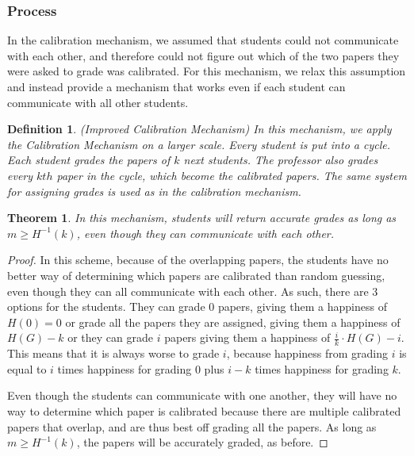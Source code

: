 \documentclass[12pt, Arial]{article}
\newtheorem{theorem}{Theorem}
\newtheorem{definition}{Definition}
\begin{document}
\subsubsection{Process}
In the calibration mechanism, we assumed that students could not communicate with each other, and therefore could not figure out which of the two papers they were asked to grade was calibrated. For this mechanism, we relax this assumption and instead provide a mechanism that works even if each student can communicate with all other students.\\
\begin{definition}(Improved Calibration Mechanism)
In this mechanism, we apply the Calibration Mechanism on a larger scale. Every student is put into a cycle. Each student grades the papers of $k$ next students. The professor also grades every $kth$ paper in the cycle, which become the calibrated papers. The same system for assigning grades is used as in the calibration mechanism.
\end{definition}
\medskip
\begin{theorem}
In this mechanism, students will return accurate grades as long as $m \geq H^{-1}(k)$, even though they can communicate with each other.
\end{theorem}
\begin{proof}
In this scheme, because of the overlapping papers, the students have no better way of determining which papers are calibrated than random guessing, even though they can all communicate with each other. As such, there are 3 options for the students. They can grade 0 papers, giving them a happiness of $H(0) = 0$ or grade all the papers they are assigned, giving them a happiness of $H(G) - k$ or they can grade $i$ papers giving them a happiness of $\frac{i}{k} \cdot H(G)-i$. This means that it is always worse to grade $i$, because happiness from grading $i$ is equal to $i$ times happiness for grading 0 plus $i-k$ times happiness for grading $k$.

Even though the students can communicate with one another, they will have no way to determine which paper is calibrated because there are multiple calibrated papers that overlap, and are thus best off grading all the papers. As long as $m \geq H^{-1}(k)$, the papers will be accurately graded, as before.

\end{proof}
\end{document}

